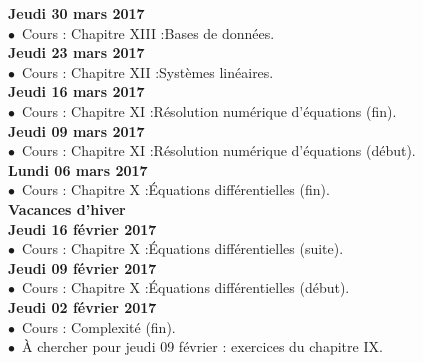 \documentclass[12pt,a4paper]{article}
\begin{document}
\noindent\textbf{\bf Jeudi 30 mars 2017 \rm}\\
$\bullet$\ Cours : Chapitre XIII :\rm Bases de données.
\vspace{.4cm}\\

\noindent\textbf{\bf Jeudi 23 mars 2017 \rm}\\
$\bullet$\ Cours : Chapitre XII :\rm Systèmes linéaires.
\vspace{.4cm}\\

\noindent\textbf{\bf Jeudi 16 mars 2017 \rm}\\
$\bullet$\ Cours : Chapitre XI :\rm Résolution numérique d'équations (fin).
\vspace{.4cm}\\

\noindent\textbf{\bf Jeudi 09 mars 2017 \rm}\\
$\bullet$\ Cours : Chapitre XI :\rm Résolution numérique d'équations (début).
\vspace{.4cm}\\

\noindent\textbf{\bf Lundi 06 mars 2017 \rm}\\
$\bullet$\ Cours : Chapitre X :\rm Équations différentielles (fin).
\vspace{.4cm}\\

\noindent\textbf{\bf Vacances d'hiver\vspace{.4cm} }\\

\noindent\textbf{\bf Jeudi 16 février 2017 \rm}\\
$\bullet$\ Cours : Chapitre X :\rm Équations différentielles (suite).
\vspace{.4cm}\\

\noindent\textbf{\bf Jeudi 09 février 2017 \rm}\\
$\bullet$\ Cours : Chapitre X :\rm Équations différentielles (début).
\vspace{.4cm}\\

\noindent\textbf{\bf Jeudi 02 février 2017 \rm}\\
$\bullet$\ Cours : Complexité (fin).\\
$\bullet$\ À chercher pour jeudi 09 février : exercices du chapitre IX.
\vspace{.4cm}\\
\end{document}
